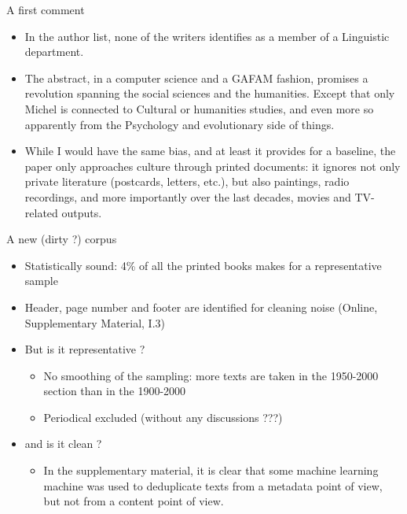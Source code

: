 \documentclass[aspectratio=169]{beamer}
\begin{document}
\begin{frame}{A first comment}
    \begin{itemize}
        \item In the author list, none of the writers identifies as a member of a Linguistic department.
        \item The abstract, in a computer science and a GAFAM fashion, promises a revolution spanning the social sciences and the humanities. Except that only Michel is connected to Cultural or humanities studies, and even more so apparently from the Psychology and evolutionary side of things.
        \item While I would have the same bias, and at least it provides for a baseline, the paper only approaches culture through printed documents: it ignores not only private literature (postcards, letters, etc.), but also paintings, radio recordings, and more importantly over the last decades, movies and TV-related outputs.
    \end{itemize}
\end{frame}

\begin{frame}{A new (dirty ?) corpus }
    \begin{itemize}
        \item Statistically sound: 4\% of all the printed books makes for a representative sample
        \item Header, page number and footer are identified for cleaning noise (Online, Supplementary Material, I.3) 
        \item But is it representative ?
        \begin{itemize}
            \item No smoothing of the sampling: more texts are taken in the 1950-2000 section than in the 1900-2000
            \item Periodical excluded (without any discussions ???)
        \end{itemize}
        \item and is it clean ?
        \begin{itemize}
            \item In the supplementary material, it is clear that some machine learning machine was used to deduplicate texts from a metadata point of view, but not from a content point of view.
        \end{itemize}
    \end{itemize}
\end{frame}
\end{document}
